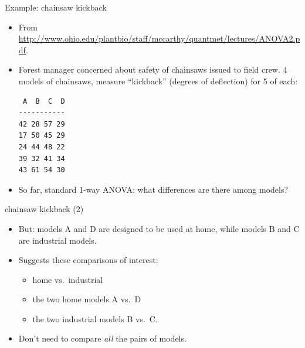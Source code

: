 \documentclass[unknownkeysallowed]{beamer}\usepackage[]{graphicx}\usepackage[]{color}
\begin{document}
\begin{frame}[fragile]{Example: chainsaw kickback}
  
  \begin{itemize}
    \item From \url{http://www.ohio.edu/plantbio/staff/mccarthy/quantmet/lectures/ANOVA2.pdf}.
  \item Forest manager concerned about safety of chainsaws issued to
    field crew. 4 models of chainsaws, measure ``kickback'' (degrees
    of deflection) for 5 of each:
    
\begin{verbatim}
 A  B  C  D
-----------
42 28 57 29
17 50 45 29
24 44 48 22
39 32 41 34
43 61 54 30
\end{verbatim}
    
    \item So far, standard 1-way ANOVA: what differences are there
      among models?
  \end{itemize}
  
\end{frame}

\begin{frame}[fragile]{chainsaw kickback (2)}
  
  \begin{itemize}
    \item But: models A and D are designed to be used at home, while
      models B and C are industrial models.
    \item Suggests these comparisons of interest:
      \begin{itemize}
      \item home vs.\ industrial
      \item the two home models A vs.\ D
      \item the two industrial models B vs.\ C.
      \end{itemize}
    \item Don't need to compare \emph{all} the pairs of models.

  \end{itemize}
  
\end{frame}
\end{document}
